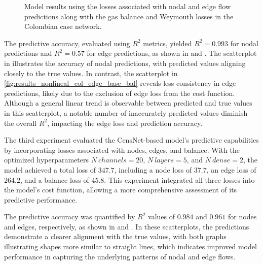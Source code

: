 \begin{figure}[htbp]
    \centering
    \setlength{}        
    \setlength{} 
    
    \caption{Model results using the losses associated with nodal and edge flow predictions along with the gas balance and Weymouth losses in the Colombian case network.}
    \label{fig:col_base_bal_results_non_lineal}
\end{figure}



The predictive accuracy, evaluated using \( R^2 \) metrics, yielded \( R^2 = 0.993 \) for nodal predictions and \( R^2 = 0.57 \) for edge predictions, as shown in  and . The scatterplot in  illustrates the accuracy of nodal predictions, with predicted values aligning closely to the true values. In contrast, the scatterplot in \cref{fig:results_nonlineal_col_edge_base_bal} reveals less consistency in edge predictions, likely due to the exclusion of edge loss from the cost function. Although a general linear trend is observable between predicted and true values in this scatterplot, a notable number of inaccurately predicted values diminish the overall \( R^2 \), impacting the edge loss and prediction accuracy.







The third experiment evaluated the CensNet-based model's predictive capabilities by incorporating losses associated with nodes, edges, and balance. With the optimized hyperparameters \( N \ channels = 20 \), \( N \ layers = 5 \), and \( N \ dense = 2 \), the model achieved a total loss of \( 347.7 \), including a node loss of \( 37.7 \), an edge loss of \( 264.2 \), and a balance loss of \( 45.8 \). This experiment integrated all three losses into the model's cost function, allowing a more comprehensive assessment of its predictive performance.

The predictive accuracy was quantified by \( R^2 \) values of \( 0.984 \) and \( 0.961 \) for nodes and edges, respectively, as shown in  and . In these scatterplots, the predictions demonstrate a clearer alignment with the true values, with both graphs illustrating shapes more similar to straight lines, which indicates improved model performance in capturing the underlying patterns of nodal and edge flows.


